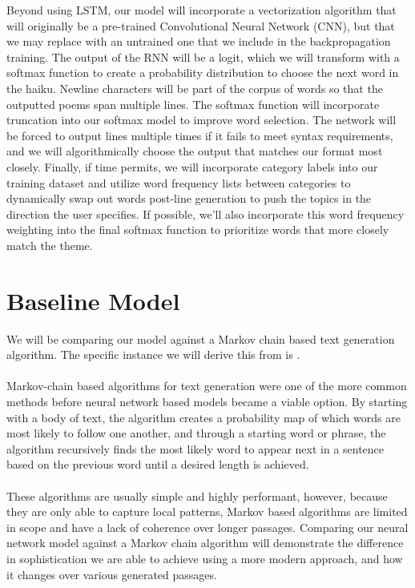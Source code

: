 \documentclass{article} %
\begin{document}
Beyond using LSTM, our model will incorporate a vectorization algorithm that will originally be a pre-trained Convolutional Neural Network (CNN), but that we may replace with an untrained one that we include in the backpropagation training.
The output of the RNN will be a logit, which we will transform with a softmax function to create a probability distribution to choose the next word in the haiku.
Newline characters will be part of the corpus of words so that the outputted poems span multiple lines.
The softmax function will incorporate truncation into our softmax model to improve word selection.
The network will be forced to output lines multiple times if it fails to meet syntax requirements, and we will algorithmically choose the output that matches our format most closely.
Finally, if time permits, we will incorporate category labels into our training dataset and utilize word frequency lists between categories to dynamically swap out words post-line generation to push the topics in the direction the user specifies.
If possible, we’ll also incorporate this word frequency weighting into the final softmax function to prioritize words that more closely match the theme.


\section{Baseline Model}

We will be comparing our model against a Markov chain based text generation algorithm.
The specific instance we will derive this from is \citep{haikugeneration}.\\\\
Markov-chain based algorithms for text generation were one of the more common methods before neural network based models became a viable option.
By starting with a body of text, the algorithm creates a probability map of which words are most likely to follow one another, 
and through a starting word or phrase, the algorithm recursively finds the most likely word to appear next in a sentence based on the previous word until a desired length is achieved.\\\\
These algorithms are usually simple and highly performant, however, because they are only able to capture local patterns, Markov based algorithms are limited in scope and have a lack of coherence over longer passages. 
Comparing our neural network model against a Markov chain algorithm will demonstrate the difference in sophistication we are able to achieve using a more modern approach, 
and how it changes over various generated passages.
\end{document}
